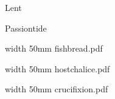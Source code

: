 
\bigskip

\eject

\beginpart Lent


\paginaproxima


\paginaproxima

\beginpart Passiontide


\bigskip

\paginaproxima


\bigskip



\eject


\bigskip

\saveimageresource width 50mm {fishbread.pdf}

\centerline{\useimageresource \lastsavedimageresourceindex}



\bigskip

\eject


\bigskip

\saveimageresource width 50mm {hostchalice.pdf}

\centerline{\useimageresource \lastsavedimageresourceindex}



\bigskip

\eject


\paginaproxima


\bigskip

\saveimageresource width 50mm {crucifixion.pdf}

\centerline{\useimageresource \lastsavedimageresourceindex}




